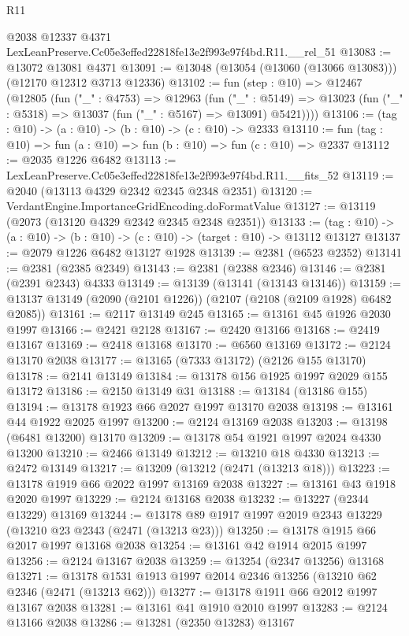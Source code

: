 \begin{lexlean}{R11}
\begin{coremodule}
    @2038
    @12337
    @4371
    LexLeanPreserve.Cc05e3effed22818fe13e2f993e97f4bd.R11.__rel_51
@13083 := @13072 @13081 @4371
@13091 := @13048 (@13054 (@13060 (@13066 @13083))) (@12170 @12312 @3713 @12336)
@13102 := fun (step : @10) =>
  @12467
    (@12805
      (fun ("_" : @4753) =>
      @12963
        (fun ("_" : @5149) =>
        @13023 (fun ("_" : @5318) => @13037 (fun ("_" : @5167) => @13091) @5421))))
@13106 := (tag : @10) -> (a : @10) -> (b : @10) -> (c : @10) -> @2333
@13110 := fun (tag : @10) => fun (a : @10) => fun (b : @10) => fun (c : @10) => @2337
@13112 := @2035 @1226 @6482
@13113 := LexLeanPreserve.Cc05e3effed22818fe13e2f993e97f4bd.R11.__fits_52
@13119 := @2040 (@13113 @4329 @2342 @2345 @2348 @2351)
@13120 := VerdantEngine.ImportanceGridEncoding.doFormatValue
@13127 := @13119 (@2073 (@13120 @4329 @2342 @2345 @2348 @2351))
@13133 := (tag : @10) -> (a : @10) -> (b : @10) -> (c : @10) -> (target : @10) -> @13112 @13127
@13137 := @2079 @1226 @6482 @13127 @1928
@13139 := @2381 (@6523 @2352)
@13141 := @2381 (@2385 @2349)
@13143 := @2381 (@2388 @2346)
@13146 := @2381 (@2391 @2343) @4333
@13149 := @13139 (@13141 (@13143 @13146))
@13159 := @13137 @13149 (@2090 (@2101 @1226)) (@2107 (@2108 (@2109 @1928) @6482 @2085))
@13161 := @2117 @13149 @245
@13165 := @13161 @45 @1926 @2030 @1997
@13166 := @2421 @2128
@13167 := @2420 @13166
@13168 := @2419 @13167
@13169 := @2418 @13168
@13170 := @6560 @13169
@13172 := @2124 @13170 @2038
@13177 := @13165 (@7333 @13172) (@2126 @155 @13170)
@13178 := @2141 @13149
@13184 := @13178 @156 @1925 @1997 @2029 @155 @13172
@13186 := @2150 @13149 @31
@13188 := @13184 (@13186 @155)
@13194 := @13178 @1923 @66 @2027 @1997 @13170 @2038
@13198 := @13161 @44 @1922 @2025 @1997
@13200 := @2124 @13169 @2038
@13203 := @13198 (@6481 @13200) @13170
@13209 := @13178 @54 @1921 @1997 @2024 @4330 @13200
@13210 := @2466 @13149
@13212 := @13210 @18 @4330
@13213 := @2472 @13149
@13217 := @13209 (@13212 (@2471 (@13213 @18)))
@13223 := @13178 @1919 @66 @2022 @1997 @13169 @2038
@13227 := @13161 @43 @1918 @2020 @1997
@13229 := @2124 @13168 @2038
@13232 := @13227 (@2344 @13229) @13169
@13244 := @13178 @89 @1917 @1997 @2019 @2343 @13229 (@13210 @23 @2343 (@2471 (@13213 @23)))
@13250 := @13178 @1915 @66 @2017 @1997 @13168 @2038
@13254 := @13161 @42 @1914 @2015 @1997
@13256 := @2124 @13167 @2038
@13259 := @13254 (@2347 @13256) @13168
@13271 := @13178 @1531 @1913 @1997 @2014 @2346 @13256 (@13210 @62 @2346 (@2471 (@13213 @62)))
@13277 := @13178 @1911 @66 @2012 @1997 @13167 @2038
@13281 := @13161 @41 @1910 @2010 @1997
@13283 := @2124 @13166 @2038
@13286 := @13281 (@2350 @13283) @13167

\end{coremodule}
\end{lexlean}
